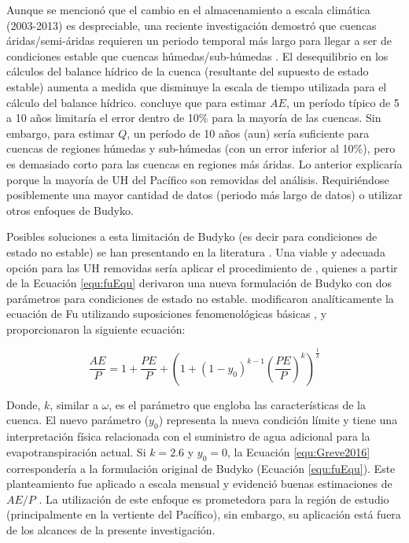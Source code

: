 \documentclass[12pt]{article}
\begin{document}
\clearpage

\clearpage

Aunque se mencionó que el cambio en el almacenamiento a escala climática (2003-2013) es despreciable, una reciente investigación demostró que cuencas áridas/semi-áridas requieren un periodo temporal más largo para llegar a ser de condiciones estable que cuencas húmedas/sub-húmedas \citep{hanassessing}. El desequilibrio en los cálculos del balance hídrico de la cuenca (resultante del supuesto de estado estable) aumenta a medida que disminuye la escala de tiempo utilizada para el cálculo del balance hídrico. \citet{hanassessing} concluye que para estimar $AE$, un período típico de 5 a 10 años limitaría el error dentro de 10\% para la mayoría de las cuencas. Sin embargo, para estimar $Q$, un período de 10 años (aun) sería suficiente para cuencas de regiones húmedas y sub-húmedas (con un error inferior al 10\%), pero es demasiado corto para las cuencas en regiones más áridas. Lo anterior explicaría porque la mayoría de UH del Pacífico son removidas del análisis. Requiriéndose posiblemente una mayor cantidad de datos (periodo más largo de datos) o utilizar otros enfoques de Budyko.

Posibles soluciones a esta limitación de Budyko (es decir para condiciones de estado no estable) se han presentando en la literatura \citep{greve2016two,moussa2016budyko,fathi2019new,mianabadi2020budyko}. Una viable y adecuada opción para las UH removidas sería aplicar el procedimiento de \citet{greve2016two}, quienes a partir de la Ecuación \ref{equ:fuEqu} \citep{Fu1981,Zhang2004} derivaron una nueva formulación de Budyko con dos parámetros para condiciones de estado no estable. \citet{greve2016two} modificaron analíticamente la ecuación de Fu utilizando suposiciones fenomenológicas básicas \citep[similar a][]{Zhang2004}, y proporcionaron la siguiente ecuación:

\begin{equation}
    \frac{AE}{P} = 1 + \frac{PE}{P} + \left ( 1 + \left ( 1 - y_{0} \right )^{k-1} \left (\frac{PE}{P}  \right )^{k} \right )^{\frac{1}{k}}
    \label{equ:Greve2016}
\end{equation}

Donde, $k$, similar a $\omega$, es el parámetro que engloba las características de la cuenca. El nuevo parámetro ($y_{0}$) representa la nueva condición límite y tiene una interpretación física relacionada con el suministro de agua adicional para la evapotranspiración actual. Si $k=2.6$ y $y_{0}=0$, la Ecuación \ref{equ:Greve2016} correspondería a la formulación original de Budyko (Ecuación \ref{equ:fuEqu}). Este planteamiento fue aplicado a escala mensual y evidenció buenas estimaciones de $AE/P$ \citep{greve2016two}. La utilización de este enfoque es prometedora para la región de estudio (principalmente en la vertiente del Pacífico), sin embargo, su aplicación está fuera de los alcances de la presente investigación. 
\end{document}
